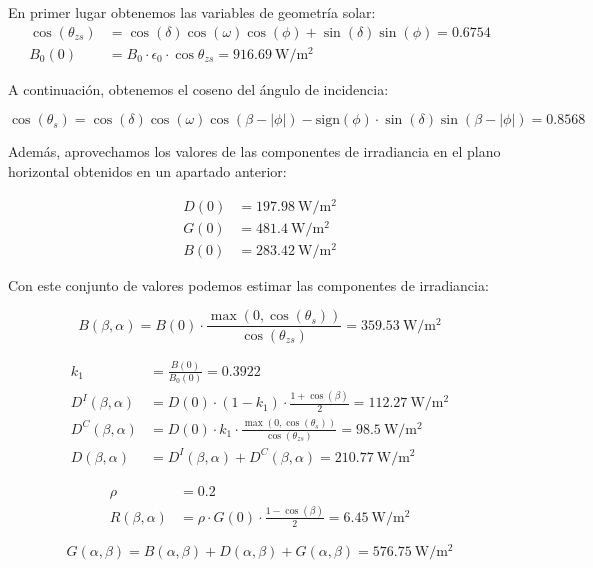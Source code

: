 \begin{itemize}
  En primer lugar obtenemos las variables de geometría solar:
  \begin{align*}
    \cos(\theta_{zs}) &= \cos(\delta) \cos(\omega) \cos(\phi) + \sin(\delta) \sin(\phi) = 0.6754\\
    B_{0}(0) &=B_{0}\cdot\epsilon_{0}\cdot\cos\theta_{zs} = \SI{916.69}{\watt\per\meter\squared}
  \end{align*}

  A continuación, obtenemos el coseno del ángulo de incidencia:

\[
  \cos(\theta_{s}) = \cos(\delta)\cos(\omega)\cos(\beta-|\phi|)-
  \mathrm{sign}(\phi)\cdot\sin(\delta)\sin(\beta-|\phi|) = 0.8568
\]

Además, aprovechamos los valores de las componentes de irradiancia en
el plano horizontal obtenidos en un apartado anterior:

\begin{align*}
  D(0) &= \SI{197.98}{\watt\per\meter\squared}\\
  G(0) &= \SI{481.4}{\watt\per\meter\squared}\\
  B(0) &= \SI{283.42}{\watt\per\meter\squared}
\end{align*}

Con este conjunto de valores podemos estimar las componentes de
irradiancia:

\[
  B(\beta,\alpha) =
  B(0)\cdot\frac{\max(0,\cos(\theta_{s}))}{\cos(\theta_{zs})} =
  \SI{359.53}{\watt\per\meter\squared}
\]

\begin{align*}
  k_{1} &= \frac{B(0)}{B_{0}(0)} = 0.3922\\
  D^{I}(\beta,\alpha) &= D(0) \cdot (1-k_{1}) \cdot \frac{1 + \cos(\beta)}{2} = \SI{112.27}{\watt\per\meter\squared}\\
  D^{C}(\beta,\alpha) &= D(0) \cdot k_{1} \cdot \frac{\max(0,\cos(\theta_{s}))}{\cos(\theta_{zs})} = \SI{98.5}{\watt\per\meter\squared}\\
  D(\beta,\alpha) &= D^{I}(\beta,\alpha)+D^{C}(\beta,\alpha) = \SI{210.77}{\watt\per\meter\squared}
\end{align*}

\begin{align*}
  \rho &= 0.2\\
  R(\beta,\alpha) &= \rho\cdot G(0)\cdot\frac{1-\cos(\beta)}{2} = \SI{6.45}{\watt\per\meter\squared}
\end{align*}

\[
  G(\alpha,\beta) = B(\alpha, \beta) + D(\alpha, \beta) + G(\alpha,
  \beta) = \SI{576.75}{\watt\per\meter\squared}
\]
\end{itemize}
